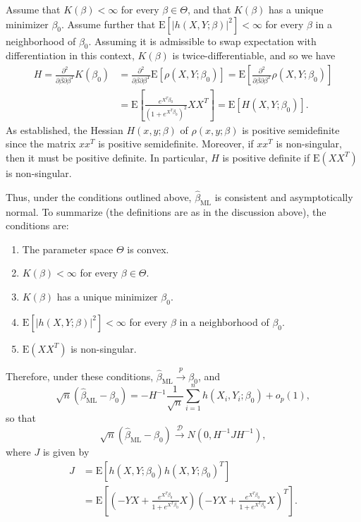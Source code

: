 \documentclass[12pt]{article}
\newcommand{\E}{\mathrm{E}}
\begin{document}
\begin{enumerate}
\begin{enumerate}[label=(\roman*)]
Assume that $K(\beta) < \infty$ for every $\beta \in \Theta$, and that $K(\beta)$ has a unique minimizer $\beta_0$. Assume further that $\E[|h(X, Y; \beta)|^2] < \infty$ for every $\beta$ in a neighborhood of $\beta_0$. Assuming it is admissible to swap expectation with differentiation in this context, $K(\beta)$ is twice-differentiable, and so we have
\begin{align*}
H = \frac{\partial^2}{\partial \beta \partial \beta^T} K(\beta_0) &= \frac{\partial^2}{\partial \beta \partial \beta^T} \E[\rho(X, Y; \beta_0)] = \E\left[\frac{\partial^2}{\partial \beta \partial \beta^T} \rho(X, Y; \beta_0)\right] \\
&= \E\left[\frac{e^{X^T\beta_0}}{(1 + e^{X^T\beta_0})^2} XX^T\right] = \E[H(X, Y; \beta_0)].
\end{align*}
As established, the Hessian $H(x, y; \beta)$ of $\rho(x, y; \beta)$ is positive semidefinite since the matrix $xx^T$ is positive semidefinite. Moreover, if $xx^T$ is non-singular, then it must be positive definite. In particular, $H$ is positive definite if $\E(XX^T)$ is non-singular.

Thus, under the conditions outlined above, $\hat{\beta}_\mathrm{ML}$ is consistent and asymptotically normal. To summarize (the definitions are as in the discussion above), the conditions are:
\begin{enumerate}[label=(\arabic*)]
\item
The parameter space $\Theta$ is convex.

\item
$K(\beta) < \infty$ for every $\beta \in \Theta$.

\item
$K(\beta)$ has a unique minimizer $\beta_0$.

\item
$\E[|h(X, Y; \beta)|^2] < \infty$ for every $\beta$ in a neighborhood of $\beta_0$.

\item
$\E(XX^T)$ is non-singular.

\end{enumerate}
Therefore, under these conditions, $\hat{\beta}_\mathrm{ML} \overset{p}\to \beta_0$, and
\begin{equation*}
\sqrt{n}(\hat{\beta}_\mathrm{ML} - \beta_0) = -H^{-1} \frac{1}{\sqrt{n}} \sum_{i=1}^n h(X_i, Y_i; \beta_0) + o_p(1),
\end{equation*}
so that
\begin{equation*}
\sqrt{n}(\hat{\beta}_\mathrm{ML} - \beta_0) \overset{\mathcal{D}}\to N(0, H^{-1}JH^{-1}),
\end{equation*}
where $J$ is given by
\begin{align*}
J &= \E[h(X, Y; \beta_0)h(X, Y; \beta_0)^T] \\
&= \E\left[\left(-YX + \frac{e^{X^T\beta_0}}{1 + e^{X^T\beta_0}} X\right) \left(-YX + \frac{e^{X^T\beta_0}}{1 + e^{X^T\beta_0}} X\right)^T\right].
\end{align*}


\end{enumerate}
\end{enumerate}
\end{document}
